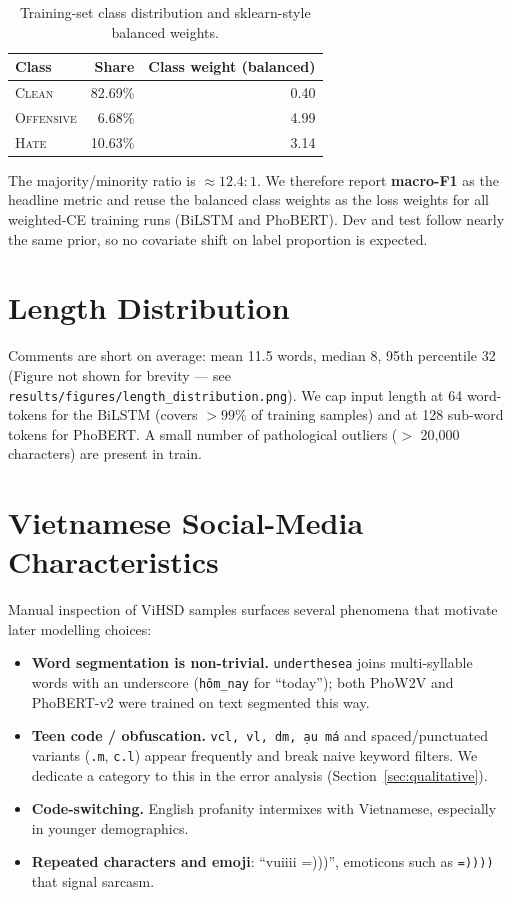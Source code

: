 \documentclass[a4paper,12pt,oneside]{report}
\begin{document}
\begin{table}[H]
\centering
\caption{Training-set class distribution and sklearn-style balanced
weights.}
\label{tab:imbalance}
\begin{tabular}{lrr}
\toprule
Class & Share & Class weight (balanced) \\ \midrule
\textsc{Clean}      & 82.69\% & 0.40 \\
\textsc{Offensive}  &  6.68\% & 4.99 \\
\textsc{Hate}       & 10.63\% & 3.14 \\ \bottomrule
\end{tabular}
\end{table}

The majority/minority ratio is $\approx 12.4:1$. We therefore report
\textbf{macro-F1} as the headline metric and reuse the balanced class
weights as the loss weights for all weighted-CE training runs (BiLSTM and
PhoBERT). Dev and test follow nearly the same prior, so no covariate
shift on label proportion is expected.

\section{Length Distribution}
Comments are short on average: mean 11.5 words, median 8, 95th
percentile 32 (Figure not shown for brevity --- see
\texttt{results/figures/length\_distribution.png}).
We cap input length at 64 word-tokens for the BiLSTM (covers $>99\%$ of
training samples) and at 128 sub-word tokens for PhoBERT. A small number
of pathological outliers ($>$ 20{,}000 characters) are present in train.

\section{Vietnamese Social-Media Characteristics}
Manual inspection of ViHSD samples surfaces several phenomena that
motivate later modelling choices:

\begin{itemize}
  \item \textbf{Word segmentation is non-trivial.} \texttt{underthesea}
        joins multi-syllable words with an underscore (\texttt{h\^om\_nay}
        for ``today''); both PhoW2V and PhoBERT-v2 were trained on
        text segmented this way.
  \item \textbf{Teen code / obfuscation.} \texttt{vcl, vl, dm, \dj\d{a}u m\'a}
        and spaced/punctuated variants (\texttt{\dj.m}, \texttt{c.l})
        appear frequently and break naive keyword filters. We dedicate
        a category to this in the error analysis
        (Section~\ref{sec:qualitative}).
  \item \textbf{Code-switching.} English profanity intermixes with
        Vietnamese, especially in younger demographics.
  \item \textbf{Repeated characters and emoji}: ``vuiiii =)))'',
        emoticons such as \texttt{=))))} that signal sarcasm.
\end{itemize}
\end{document}
